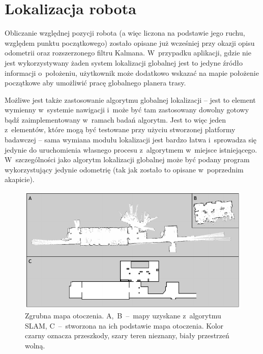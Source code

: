 \section{Lokalizacja robota}

Obliczanie względnej pozycji robota (a więc liczona na podstawie jego ruchu, względem
punktu początkowego) zostało opisane już wcześniej przy okazji opisu odometrii
oraz rozszerzonego filtru Kalmana. W~przypadku aplikacji, gdzie nie jest wykorzystywany
żaden system lokalizacji globalnej jest to jedyne źródło informacji o~położeniu,
użytkownik może dodatkowo wskazać na mapie położenie początkowe aby umożliwić pracę
globalnego planera trasy.

Możliwe jest także zastosowanie algorytmu globalnej lokalizacji -- jest to element
wymienny w~systemie nawigacji i~może być tam zastosowany dowolny gotowy bądź zaimplementowany
w~ramach badań algorytm. Jest to więc jeden z~elementów, które mogą być testowane
przy użyciu stworzonej platformy badawczej -- sama wymiana modułu lokalizacji jest
bardzo łatwa i~sprowadza się jedynie do uruchomienia własnego procesu z~algorytmem
w~miejsce istniejącego. W~szczególności jako algorytm lokalizacji globalnej może być
podany program wykorzystujący jedynie odometrię (tak jak zostało to opisane w~poprzednim
akapicie).

\begin{figure}[htb!]
\centering
\includegraphics[width=15cm]{../../Common/img/maps}
\caption[Mapa otoczenia]{Zgrubna mapa otoczenia. A,~B~--~mapy uzyskane z~algorytmu SLAM, 
C~--~stworzona na ich podstawie mapa otoczenia. Kolor czarny oznacza przeszkody, szary teren
nieznany, biały przestrzeń wolną.}
\label{fig:maps}
\end{figure}

